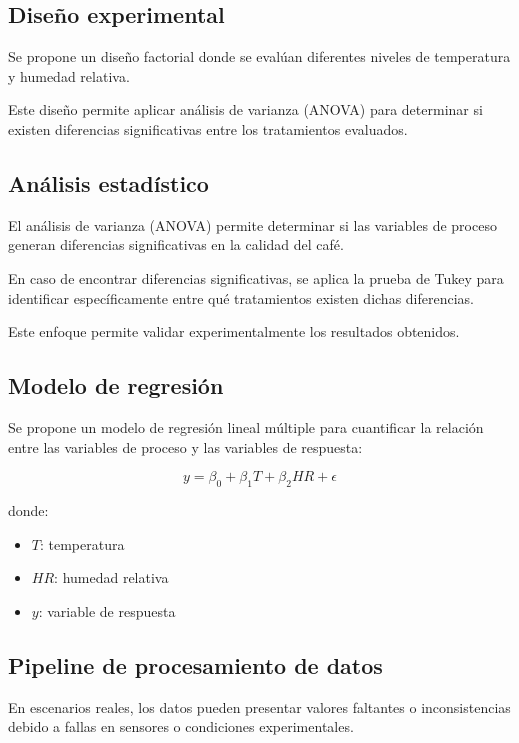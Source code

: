 \subsection{Diseño experimental}

Se propone un diseño factorial donde se evalúan diferentes niveles de temperatura y humedad relativa.

Este diseño permite aplicar análisis de varianza (ANOVA) para determinar si existen diferencias significativas entre los tratamientos evaluados.

\subsection{Análisis estadístico}

El análisis de varianza (ANOVA) permite determinar si las variables de proceso generan diferencias significativas en la calidad del café.

En caso de encontrar diferencias significativas, se aplica la prueba de Tukey para identificar específicamente entre qué tratamientos existen dichas diferencias.

Este enfoque permite validar experimentalmente los resultados obtenidos.

\subsection{Modelo de regresión}

Se propone un modelo de regresión lineal múltiple para cuantificar la relación entre las variables de proceso y las variables de respuesta:

\[
y = \beta_0 + \beta_1 T + \beta_2 HR + \epsilon
\]

donde:

\begin{itemize}
    \item $T$: temperatura
    \item $HR$: humedad relativa
    \item $y$: variable de respuesta
\end{itemize}

\subsection{Pipeline de procesamiento de datos}

En escenarios reales, los datos pueden presentar valores faltantes o inconsistencias debido a fallas en sensores o condiciones experimentales.

